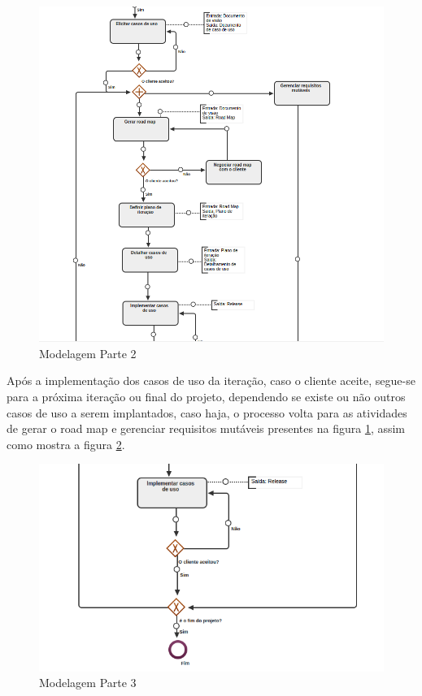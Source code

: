 \begin{figure}[H]
	\centering
	\includegraphics[width=1\textwidth]{imgModelagem/modelagem2}
	\caption{Modelagem Parte 2}
	\label{img:modelagem2}
\end{figure}

Após a implementação dos casos de uso da iteração, caso o cliente aceite, segue-se para a próxima iteração ou final do projeto, dependendo se existe ou não outros casos de uso a serem implantados, caso haja, o processo volta para as atividades de gerar o road map  e gerenciar requisitos mutáveis presentes na figura \ref{img:modelagem2}, assim como mostra a figura \ref{img:modelagem3}.

\begin{figure}[H]
	\centering
	\includegraphics[width=1\textwidth]{imgModelagem/modelagem3}
	\caption{Modelagem Parte 3}
	\label{img:modelagem3}
\end{figure}
